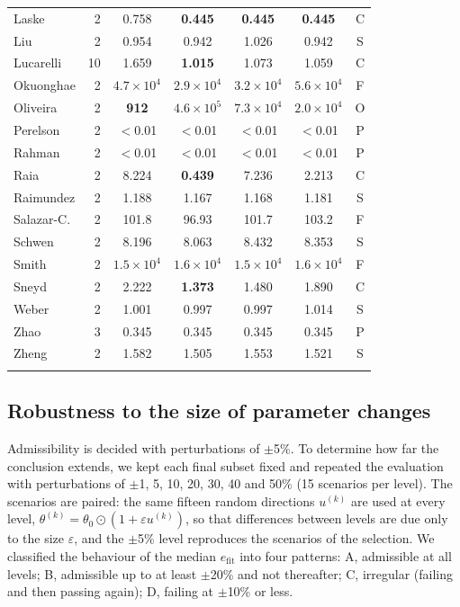 \documentclass[pdflatex,sn-nature]{sn-jnl}
\theoremstyle{plain}
\begin{document}
\begin{table}[p]
\begin{tabular}{@{}lrccccc@{}}
Laske        & 2  & 0.758 & \textbf{0.445} & \textbf{0.445} & \textbf{0.445} & C \\
Liu          & 2  & 0.954 & 0.942 & 1.026 & 0.942 & S \\
Lucarelli    & 10 & 1.659 & \textbf{1.015} & 1.073 & 1.059 & C \\
Okuonghae    & 2  & $4.7\times10^4$ & $2.9\times10^4$ & $3.2\times10^4$ & $5.6\times10^4$ & F \\
Oliveira     & 2  & \textbf{912} & $4.6\times10^5$ & $7.3\times10^4$ & $2.0\times10^4$ & O \\
Perelson     & 2  & $<$0.01 & $<$0.01 & $<$0.01 & $<$0.01 & P \\
Rahman       & 2  & $<$0.01 & $<$0.01 & $<$0.01 & $<$0.01 & P \\
Raia         & 2  & 8.224 & \textbf{0.439} & 7.236 & 2.213 & C \\
Raimundez    & 2  & 1.188 & 1.167 & 1.168 & 1.181 & S \\
Salazar-C.   & 2  & 101.8 & 96.93 & 101.7 & 103.2 & F \\
Schwen       & 2  & 8.196 & 8.063 & 8.432 & 8.353 & S \\
Smith        & 2  & $1.5\times10^4$ & $1.6\times10^4$ & $1.5\times10^4$ & $1.6\times10^4$ & F \\
Sneyd        & 2  & 2.222 & \textbf{1.373} & 1.480 & 1.890 & C \\
Weber        & 2  & 1.001 & 0.997 & 0.997 & 1.014 & S \\
Zhao         & 3  & 0.345 & 0.345 & 0.345 & 0.345 & P \\
Zheng        & 2  & 1.582 & 1.505 & 1.553 & 1.521 & S \\
\botrule
\end{tabular}
\end{table}

\subsection*{Robustness to the size of parameter changes}\label{sec:patterns}

Admissibility is decided with perturbations of $\pm$5\%. To determine how far the conclusion extends, we kept each final subset fixed and repeated the evaluation with perturbations of $\pm$1, 5, 10, 20, 30, 40 and 50\% (15 scenarios per level). The scenarios are paired: the same fifteen random directions $u^{(k)}$ are used at every level, $\theta^{(k)}=\theta_0\odot(1+\varepsilon u^{(k)})$, so that differences between levels are due only to the size $\varepsilon$, and the $\pm$5\% level reproduces the scenarios of the selection. We classified the behaviour of the median $e_{\mathrm{fit}}$ into four patterns: A, admissible at all levels; B, admissible up to at least $\pm$20\% and not thereafter; C, irregular (failing and then passing again); D, failing at $\pm$10\% or less.
\end{document}
